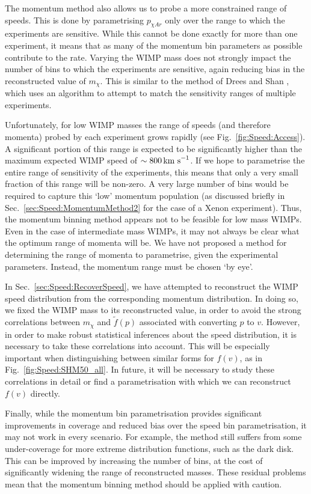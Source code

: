 The momentum method also allows us to probe a more constrained range of speeds. This is done by parametrising $p_{\chi Ar}$ only over the range to which the experiments are sensitive. While this cannot be done exactly for more than one experiment, it means that as many of the momentum bin parameters as possible contribute to the rate. Varying the WIMP mass does not strongly impact the number of bins to which the experiments are sensitive, again reducing bias in the reconstructed value of $m_\chi$. This is similar to the method of Drees and Shan \cite{Drees:2008}, which uses an algorithm to attempt to match the sensitivity ranges of multiple experiments.

Unfortunately, for low WIMP masses the range of speeds (and therefore momenta) probed by each experiment grows rapidly (see Fig.~\ref{fig:Speed:Access}). A significant portion of this range is expected to be significantly higher than the maximum expected WIMP speed of $\sim 800 \,\textrm{km s}^{-1}$. If we hope to parametrise the entire range of sensitivity of the experiments, this means that only a very small fraction of this range will be non-zero. A very large number of bins would be required to capture this `low' momentum population (as discussed briefly in Sec.~\ref{sec:Speed:MomentumMethod2} for the case of a Xenon experiment). Thus, the momentum binning method appears not to be feasible for low mass WIMPs. Even in the case of intermediate mass WIMPs, it may not always be clear what the optimum range of momenta will be. We have not proposed a method for determining the range of momenta to parametrise, given the experimental parameters. Instead, the momentum range must be chosen `by eye'.

In Sec.~\ref{sec:Speed:RecoverSpeed}, we have attempted to reconstruct the WIMP speed distribution from the corresponding momentum distribution. In doing so, we fixed the WIMP mass to its reconstructed value, in order to avoid the strong correlations between $m_\chi$ and $\tilde{f}(p)$ associated with converting $p$ to $v$. However, in order to make robust statistical inferences about the speed distribution, it is necessary to take these correlations into account. This will be especially important when distinguishing between similar forms for $f(v)$, as in Fig.~\ref{fig:Speed:SHM50_all}. In future, it will be necessary to study these correlations in detail or find a parametrisation with which we can reconstruct $f(v)$ directly.

Finally, while the momentum bin parametrisation provides significant improvements in coverage and reduced bias over the speed bin parametrisation, it may not work in every scenario. For example, the method still suffers from some under-coverage for more extreme distribution functions, such as the dark disk. This can be improved by increasing the number of bins, at the cost of significantly widening the range of reconstructed masses. These residual problems mean that the momentum binning method should be applied with caution.

